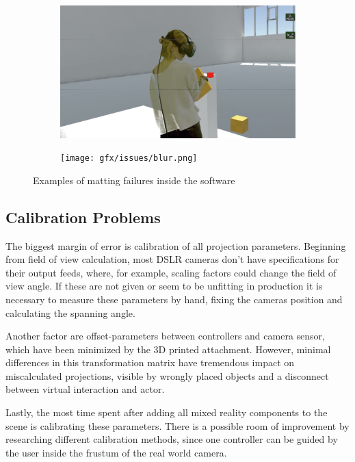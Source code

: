\begin{figure}
	\begin{subfigure}[t]{.45\textwidth}
		\centering
		\includegraphics[width=\textwidth]{gfx/issues/spill.png}
	\end{subfigure}
	\begin{subfigure}[t]{.45\textwidth}
		\centering
		\texttt{[image: gfx/issues/blur.png]}
	\end{subfigure}
	\caption{Examples of matting failures inside the software}
	\label{fig:issue:blur}
\end{figure}

\subsection{Calibration Problems}

The biggest margin of error is calibration of all projection parameters.
\newline
Beginning from field of view calculation, most DSLR cameras don't have 
specifications for their output feeds, where, for example, scaling factors 
could change the field of view angle. If these are not given or seem to be 
unfitting in production it is necessary to measure these parameters by hand, 
fixing the cameras position and calculating the spanning angle.

Another factor are offset-parameters between controllers and camera sensor, 
which have been minimized by the 3D printed attachment. However, minimal 
differences in this transformation matrix have tremendous impact on 
miscalculated projections, visible by wrongly placed objects and a disconnect 
between virtual interaction and actor.

Lastly, the most time spent after adding all mixed reality components to the 
scene is calibrating these parameters. There is a possible room of improvement 
by researching different calibration methods, since one controller can be 
guided by the user inside the frustum of the real world camera.
